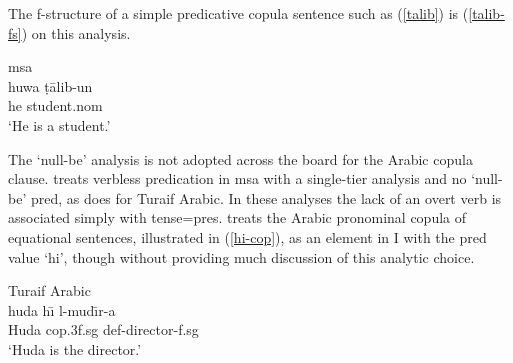 \documentclass[output=paper,hidelinks]{langscibook}
\begin{document}




\normalsize
 The f-structure of a simple predicative copula sentence such as (\ref{talib}) is (\ref{talib-fs}) on this analysis.

\ea \label{talib}  {\sc msa} \citep[107]{attia08} \\
\gll huwa ṭ\={a}lib-un\\
he student.{\sc nom}\\
\glt `He is a student.'
\z








The `null-be' analysis is not adopted across the board for the Arabic copula clause.  \citet{Alsharif:PhD} treats verbless predication in {\sc msa} with a single-tier analysis and no `null-be' {\sc pred}, as does \citet{Alruwaili:PhD} for Turaif Arabic. In these analyses the lack of an overt verb is associated simply with {\sc tense}={\sc pres}.  \citet{Alruwaili:PhD} treats the  Arabic pronominal copula of equational sentences, illustrated in (\ref{hi-cop}),  as an element in I with the {\sc pred} value `hi\arglist{\SUBJ,\OBJ}', though without providing much discussion of this analytic choice.

\ea \label{hi-cop} Turaif Arabic \citep[109]{Alruwaili:PhD}\\
\gll huda h\={\i} l-mud\={\i}r-a\\
Huda {\sc cop.3f.sg} {\sc def}-director-{\sc f.sg}\\
\glt `Huda is the director.'
\z
\end{document}

